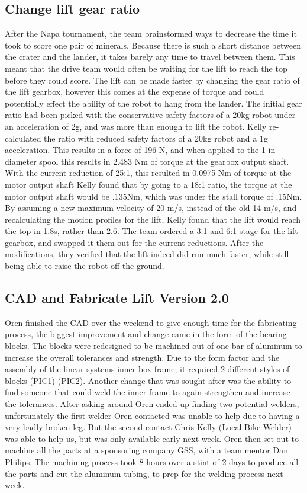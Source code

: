 \documentclass{article}
\begin{document}
\subsection{Change lift gear ratio}
After the Napa tournament, the team brainstormed ways to decrease the time it took to score one pair of minerals. 
Because there is such a short distance between the crater and the lander, it takes barely any time to travel between them. 
This meant that the drive team would often be waiting for the lift to reach the top before they could score.
The lift can be made faster by changing the gear ratio of the lift gearbox, however this comes at the expense of torque and could potentially effect the ability of the robot to hang from the lander.
The initial gear ratio had been picked with the conservative safety factors of a 20kg robot under an acceleration of 2g, and was more than enough to lift the robot. 
Kelly re-calculated the ratio with reduced safety factors of a 20kg robot and a 1g acceleration. 
This results in a force of 196 N, and when applied to the 1 in diameter spool this results in 2.483 Nm of torque at the gearbox output shaft.
With the current reduction of 25:1, this resulted in 0.0975 Nm of torque at the motor output shaft
Kelly found that by going to a 18:1 ratio, the torque at the motor output shaft would be .135Nm, which was under the stall torque of .15Nm.
By assuming a new maximum velocity of 20 m/s, instead of the old 14 m/s, and recalculating the motion profiles for the lift, Kelly found that the lift would reach the top in 1.8s, rather than 2.6.
The team ordered a 3:1 and 6:1 stage for the lift gearbox, and swapped it them out for the current reductions.
After the modifications, they verified that the lift indeed did run much faster, while still being able to raise the robot off the ground. 


\subsection{CAD and Fabricate Lift Version 2.0}
Oren finished the CAD over the weekend to give enough time for the fabricating process, the biggest improvement and change came in the form of the bearing blocks. The blocks were redesigned to be machined out of one bar of aluminum to increase the overall tolerances and strength. Due to the form factor and the assembly of the linear systems inner box frame; it required 2 different styles of blocks (PIC1) (PIC2). Another change that was sought after was the ability to find someone that could weld the inner frame to again strengthen and increase the tolerances. After asking around Oren ended up finding two potential welders, unfortunately the first welder Oren contacted was unable to help due to having a very badly broken leg. But the second contact Chris Kelly (Local Bike Welder) was able to help us, but was only available early next week. Oren then set out to machine all the parts at a sponsoring company GSS, with a team mentor Dan Philips. The machining process took 8 hours over a stint of 2 days to produce all the parts and cut the aluminum tubing, to prep for the welding process next week. 
\end{document}
